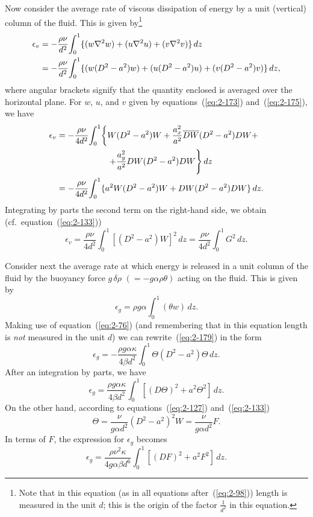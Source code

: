 Now consider the average rate of viscous dissipation of energy by a
unit (vertical) column of the fluid. This is given by\footnote{Note that in this equation (as in all equations after~(\ref{eq:2-98})) length is measured in the unit $d$; this is the origin of the factor $\frac{1}{d^2}$ in this equation.}
\begin{align}
\label{eq:2-176}
\epsilon_v &= -\frac{\rho\nu}{d^2}\!\int_0^1\{(w\nabla^2 w)+(u\nabla^2 u)+(v\nabla^2 v)\}\,dz \notag\\
&= -\frac{\rho\nu}{d^2}\!\int_0^1\{(w(D^2-a^2)w)+(u(D^2-a^2)u)+(v(D^2-a^2)v)\}\,dz,
\end{align}
where angular brackets signify that the quantity enclosed is averaged
over the horizontal plane. For $w$, $u$, and $v$ given by equations~(\ref{eq:2-173}) and~(\ref{eq:2-175}), we have
\begin{align}
\label{eq:2-177}
\epsilon_v &= -\frac{\rho\nu}{4d^2}\!\int_0^1\!\left\{W(D^2-a^2)W + \frac{a_x^2}{a^2}\overline{DW}(D^2-a^2)DW + \right. \notag\\
&\qquad\qquad\qquad\left. +\frac{a_y^2}{a^2}DW(D^2-a^2)DW\right\}dz \notag\\
&= -\frac{\rho\nu}{4d^2}\!\int_0^1\{a^2 W(D^2-a^2)W + DW(D^2-a^2)DW\}\,dz.
\end{align}
Integrating by parts the second term on the right-hand side, we obtain
(cf.\ equation~(\ref{eq:2-133}))
\begin{equation}
\label{eq:2-178}
\epsilon_v = \frac{\rho\nu}{4d^2}\!\int_0^1[(D^2-a^2)W]^2\,dz = \frac{\rho\nu}{4d^2}\!\int_0^1 G^2\,dz.
\end{equation}

Consider next the average rate at which energy is released in a unit
column of the fluid by the buoyancy force $g\,\delta\rho$ $(= -g\alpha\rho\theta)$ acting on the
fluid. This is given by
\begin{equation}
\label{eq:2-179}
\epsilon_g = \rho g\alpha\!\int_0^1(\theta w)\,dz.
\end{equation}
Making use of equation~(\ref{eq:2-76}) (and remembering that in this equation
length is \emph{not} measured in the unit $d$) we can rewrite~(\ref{eq:2-179}) in the form
\begin{equation}
\label{eq:2-180}
\epsilon_g = -\frac{\rho g\alpha\kappa}{4\beta d^2}\!\int_0^1\Theta(D^2-a^2)\Theta\,dz.
\end{equation}
After an integration by parts, we have
\begin{equation}
\label{eq:2-181}
\epsilon_g = \frac{\rho g\alpha\kappa}{4\beta d^2}\!\int_0^1[(D\Theta)^2+a^2\Theta^2]\,dz.
\end{equation}
On the other hand, according to equations~(\ref{eq:2-127}) and~(\ref{eq:2-133})
\begin{equation}
\label{eq:2-182}
\Theta = \frac{\nu}{g\alpha d^2}(D^2-a^2)^2 W = \frac{\nu}{g\alpha d^2}F.
\end{equation}
In terms of $F$, the expression for $\epsilon_g$ becomes
\begin{equation}
\label{eq:2-183}
\epsilon_g = \frac{\rho\nu^2\kappa}{4g\alpha\beta d^6}\!\int_0^1[(DF)^2+a^2 F^2]\,dz.
\end{equation}

